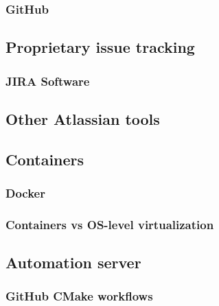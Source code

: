 \documentclass[a4paper,12pt]{article}
\begin{document}
\subsubsection{GitHub}
\subsection{Proprietary issue tracking}
\subsubsection{JIRA Software}
\subsection{Other Atlassian tools}
\subsection{Containers}
\subsubsection{Docker}
\subsubsection{Containers vs OS-level virtualization}
\subsection{Automation server}
\subsubsection{GitHub CMake workflows}
\end{document}
